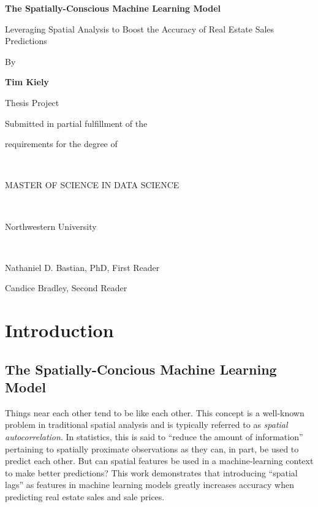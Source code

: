 \documentclass[12pt,]{article}
\title{}
\author{}
\date{}
\begin{document}

\titlepage
\center
\vspace{4 cm}
\LARGE

\bf 
The Spatially-Conscious Machine Learning Model  

\Large

Leveraging Spatial Analysis to Boost the Accuracy of Real Estate Sales
Predictions

\rm
\normalsize

By

\textbf{Tim Kiely}

Thesis Project

Submitted in partial fulfillment of the

requirements for the degree of

~

MASTER OF SCIENCE IN DATA SCIENCE

~

Northwestern University

~

Nathaniel D. Bastian, PhD, First Reader

Candice Bradley, Second Reader

\newpage
\normalsize
\singlespace
\tableofcontents
\doublespace
\newpage
{}

\pagestyle{plain}
\justify

\hypertarget{introduction}{%
\section{Introduction}\label{introduction}}

\hypertarget{the-spatially-concious-machine-learning-model}{%
\subsection{The Spatially-Concious Machine Learning
Model}\label{the-spatially-concious-machine-learning-model}}

Things near each other tend to be like each other. This concept is a
well-known problem in traditional spatial analysis and is typically
referred to as \emph{spatial autocorrelation}. In statistics, this is
said to ``reduce the amount of information'' pertaining to spatially
proximate observations as they can, in part, be used to predict each
other. But can spatial features be used in a machine-learning context to
make better predictions? This work demonstrates that introducing
``spatial lags'' as features in machine learning models greatly
increases accuracy when predicting real estate sales and sale prices.
\end{document}
